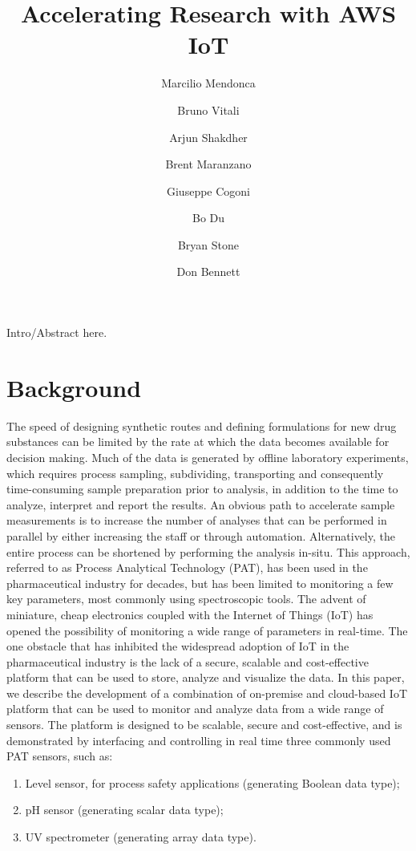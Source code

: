 \documentclass[10pt]{article}
\title{Accelerating Research with AWS IoT}
\author[1]{Marcilio Mendonca}
\author[1]{Bruno Vitali}
\author[1]{Arjun Shakdher}
\author[2]{Brent Maranzano}
\author[2]{Giuseppe Cogoni}
\author[2]{Bo Du}
\author[1]{Bryan Stone}
\author[1]{Don Bennett}
\affil[1]{AWS}
\affil[2]{Pfizer, Inc.}
\date{} %
\begin{document}
\maketitle


\section*{}
Intro/Abstract here.


\section*{Background}
The speed of designing synthetic routes and defining 
formulations for new drug substances can be limited by the
rate at which the data becomes available for decision making. 
Much of the data is generated by offline laboratory
experiments, which requires process sampling, subdividing, 
transporting and consequently time-consuming sample 
preparation prior to analysis, in addition to the time
to analyze, interpret and report the results. An obvious
path to accelerate sample measurements is to increase the
number of analyses that can be performed in parallel by
either increasing the staff or through automation.
Alternatively, the entire process can be shortened by performing
the analysis in-situ. This approach, referred to as 
Process Analytical Technology (PAT), has been used in the
pharmaceutical industry for decades, but has been limited
to monitoring a few key parameters, most commonly using spectroscopic tools. 
The advent of miniature, cheap electronics coupled 
with the Internet of Things (IoT) has opened the possibility of 
monitoring a wide range of parameters in real-time.
The one obstacle that has inhibited the widespread adoption
of IoT in the pharmaceutical industry is the lack of a secure, 
scalable and cost-effective platform that can be used to store, 
analyze and visualize the data. In this paper, we describe the development of a
combination of on-premise and cloud-based IoT platform
that can be used to monitor and analyze data from a wide
range of sensors. The platform is designed to be scalable,
secure and cost-effective, and is demonstrated 
by interfacing and controlling in real time three commonly used PAT sensors, such as:
\begin{enumerate}
	\item Level sensor, for process safety applications (generating Boolean data type);
	\item pH sensor (generating scalar data type);
	\item UV spectrometer (generating array data type).
\end{enumerate}
\end{document}

